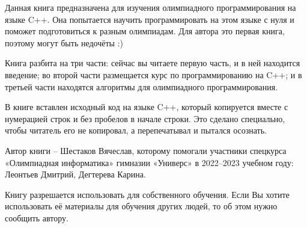 Данная книга предназначена для изучения олимпиадного программирования на языке C++. Она попытается научить программировать на этом языке с нуля и поможет подготовиться к разным олимпиадам. Для автора это первая книга, поэтому могут быть недочёты :)

Книга разбита на три части: сейчас вы читаете первую часть, и в ней находится введение; во второй части размещается курс по программированию на C++; и в третьей части находятся алгоритмы для олимпиадного программирования.

В книге вставлен исходный код на языке C++, который копируется вместе с нумерацией строк и без пробелов в начале строки. Это сделано специально, чтобы читатель его не копировал, а перепечатывал и пытался осознать.

Автор книги – Шестаков Вячеслав, которому помогали участники спецкурса «Олимпиадная информатика» гимназии «Универс» в 2022–2023 учебном году: Леонтьев Дмитрий, Дегтерева Карина.

Книгу разрешается использовать для собственного обучения. Если Вы хотите использовать её материалы для обучения других людей, то об этом нужно сообщить автору.
